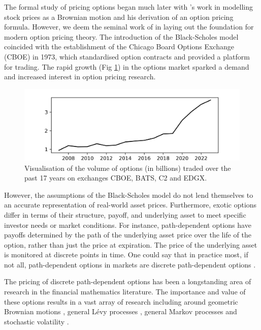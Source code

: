 \documentclass[a4paper]{report}
\begin{document}
The formal study of pricing options began much later with \citet{bachelier1900theorie}'s work in modelling stock prices as a Brownian motion and his derivation of an option pricing formula. However, we deem the seminal work of \citet{black1973pricing} in laying out the foundation for modern option pricing theory. The introduction of the Black-Scholes model coincided with the establishment of the Chicago Board Options Exchange (CBOE) in 1973, which standardised option contracts and provided a platform for trading. The rapid growth (Fig \ref{fig:volume_of_options}) in the options market sparked a demand and increased interest in option pricing research.

\begin{figure}[h]
	\centering
	\includegraphics[width=0.7\linewidth]{images/options_volume.png}
	\captionsetup{justification=centering}
    \caption{Visualisation of the volume of options (in billions) traded over the past 17 years on exchanges CBOE, BATS, C2 and EDGX.}
    \label{fig:volume_of_options}
\end{figure}
However, the assumptions of the Black-Scholes model do not lend themselves to an accurate representation of real-world asset prices. Furthermore, exotic options differ in terms of their structure, payoff, and underlying asset to meet specific investor needs or market conditions. For instance, path-dependent options have payoffs determined by the path of the underlying asset price over the life of the option, rather than just the price at expiration. The price of the underlying asset is monitored at discrete points in time. One could say that in practice most, if not all, path-dependent options in markets are discrete path-dependent options \citep{kou2007discrete}.

The pricing of discrete path-dependent options has been a longstanding area of research in the financial mathematics literature. The importance and value of these options results in a vast array of research including around geometric Brownian motions \citep{lu2017improved, guardasoni2020mellin}, general L\'evy processes \citep{fang2009novel, fusai2016spitzer, phelan2018fourier, chen2021sinc, levendorskii2022sinh}, general Markov processes \citep{cui2021pricing, zhang2023general} and stochastic volatility \citep{soleymani2019pricing, kirkby2020efficient}.
\end{document}
